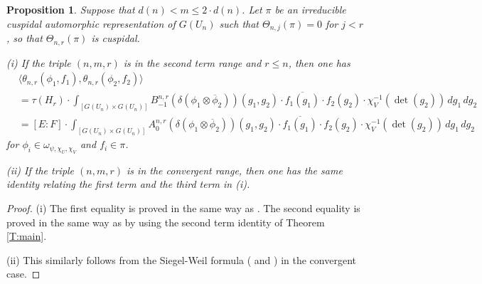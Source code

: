 \documentclass[10pt]{amsart}
\theoremstyle{plain}
\newtheorem{Prop}[equation]{Proposition}
\numberwithin{equation}{section}
\begin{document}
 \begin{Prop}\label{P:inner_product1}
Suppose that $d(n) < m \leq 2 \cdot d(n)$. Let $\pi$ be an irreducible 
cuspidal automorphic representation of $G(U_n)$ such that
$\Theta_{n,j}(\pi) = 0$ for $j < r$, so that $\Theta_{n,r}(\pi)$ is
cuspidal. 
\vskip 5pt

\noindent (i) If the triple $(n,m, r)$ is in the second term range and  $r \leq n$, 
then one has 
 \begin{align*}
&\langle \theta_{n,r}(\phi_1, f_1) , \theta_{n,r}(\phi_2, f_2) \rangle\\
&= \tau(H_r) \cdot  \int_{[G(U_n) \times G(U_n)]}    B^{n,r}_{-1}( \delta(\phi_1
\otimes \overline{\phi}_2))(g_1, g_2) \cdot \overline{f_1(g_1)} \cdot
f_2(g_2) \cdot \chi_V^{-1}(\det(g_2)) \,dg_1 \, dg_2\\
&=[E:F] \cdot  \int_{[G(U_n) \times G(U_n)]}    A^{n,r}_0(
\delta(\phi_1 \otimes \overline{\phi}_2))(g_1, g_2) \cdot
\overline{f_1(g_1)} \cdot f_2(g_2) \cdot \chi_V^{-1}(\det(g_2))\,
dg_1 \, dg_2
\end{align*}
for $\phi_i \in \omega_{\psi, \chi_U,\chi_V}$ and $f_i \in \pi$.   
 \vskip 5pt
 
 \noindent (ii) If the triple $(n,m,r)$ is in the convergent range, then one has the same identity relating the first term and the third term in (i).
  \end{Prop}
 \vskip 5pt
 \begin{proof}
(i) The first equality is proved in the same way as \cite[Prop. 6.1]{GT}. The second
equality is proved in the same way as \cite[Prop. 6.3]{GT}
by using the second term identity of Theorem \ref{T:main}.
 \vskip 5pt
 
 \noindent (ii) This similarly  follows from the Siegel-Weil formula (\cite{KR1,KR2} and \cite{I3}) in the convergent case.
 \end{proof}
 \vskip 10pt
 
 
\end{document}
